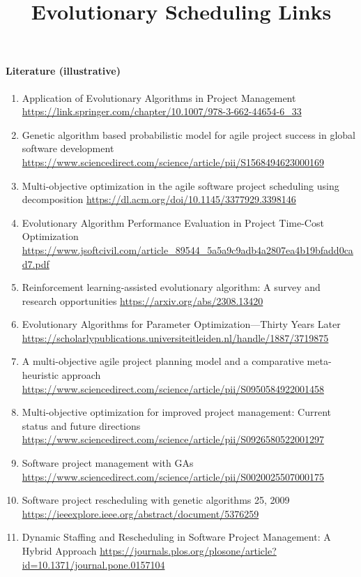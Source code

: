 \documentclass[a4paper,12pt]{article}
\title{\vspace{-2em}\bfseries Evolutionary Scheduling Links}
\author{}
\date{}
\begin{document}
\maketitle
\vspace{-1em}


\paragraph{Literature (illustrative)}
\begin{enumerate}
  \item Application of Evolutionary Algorithms in Project Management \url{https://link.springer.com/chapter/10.1007/978-3-662-44654-6_33}
  \item Genetic algorithm based probabilistic model for agile project success in global software development \url{https://www.sciencedirect.com/science/article/pii/S1568494623000169}
  \item Multi-objective optimization in the agile software project scheduling using decomposition  \url{https://dl.acm.org/doi/10.1145/3377929.3398146}
  \item Evolutionary Algorithm Performance Evaluation in Project Time-Cost Optimization \url{https://www.jsoftcivil.com/article_89544_5a5a9c9adb4a2807ea4b19bfadd0cad7.pdf}
  \item Reinforcement learning-assisted evolutionary algorithm: A survey and research opportunities \url{https://arxiv.org/abs/2308.13420}
  \item Evolutionary Algorithms for Parameter Optimization—Thirty Years Later \url{https://scholarlypublications.universiteitleiden.nl/handle/1887/3719875}
  \item A multi-objective agile project planning model and a comparative meta-heuristic approach \url{https://www.sciencedirect.com/science/article/pii/S0950584922001458}
  \item Multi-objective optimization for improved project management: Current status and future directions \url{https://www.sciencedirect.com/science/article/pii/S0926580522001297}
  \item Software project management with GAs \url{https://www.sciencedirect.com/science/article/pii/S0020025507000175}
  \item Software project rescheduling with genetic algorithms 25, 2009 \url{https://ieeexplore.ieee.org/abstract/document/5376259}
  \item Dynamic Staffing and Rescheduling in Software Project Management: A Hybrid Approach \url{https://journals.plos.org/plosone/article?id=10.1371/journal.pone.0157104}

\end{enumerate}
\end{document}
